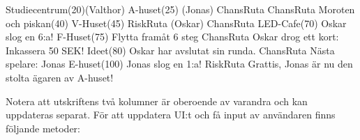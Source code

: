 \begin{REPL}
Studiecentrum(20)(Valthor)
A-huset(25) (Jonas)                                                                                                          
ChansRuta                                                                                                             
ChansRuta                                                                                                              
Moroten och piskan(40)
V-Huset(45)                                                                                                        
RiskRuta (Oskar)                                                                                                         
ChansRuta                                                                                                        
LED-Cafe(70)               Oskar slog en 6:a!                                           
F-Huset(75)                Flytta framåt 6 steg                                        
ChansRuta                  Oskar drog ett kort: Inkassera 50 SEK!
Ideet(80)                  Oskar har avslutat sin runda.                              
ChansRuta                  Nästa spelare: Jonas                                      
E-huset(100)               Jonas slog en 1:a!                                       
RiskRuta                   Grattis, Jonas är nu den stolta ägaren av A-huset!
\end{REPL}

Notera att utskriftens två kolumner är oberoende av varandra och kan uppdateras separat. För att uppdatera UI:t och få input av användaren finns följande metoder:


